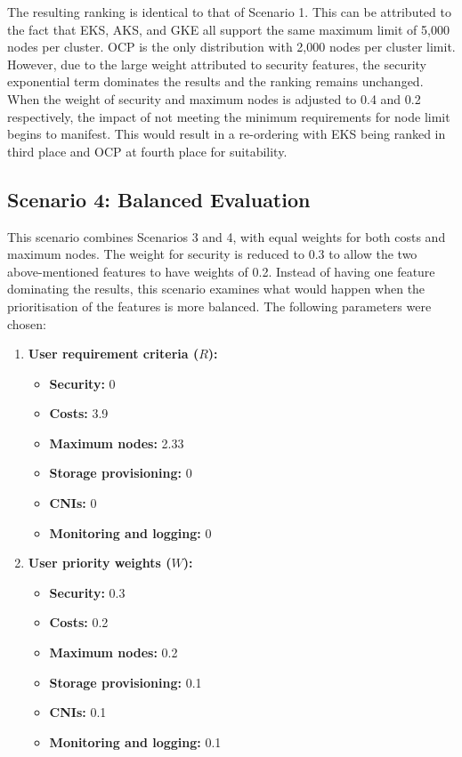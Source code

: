 The resulting ranking is identical to that of Scenario 1. This can be attributed to the fact that EKS, AKS, and GKE all support the same maximum limit of 5,000 nodes per cluster. OCP is the only distribution with 2,000 nodes per cluster limit. However, due to the large weight attributed to security features, the security exponential term dominates the results and the ranking remains unchanged. When the weight of security and maximum nodes is adjusted to 0.4 and 0.2 respectively, the impact of not meeting the minimum requirements for node limit begins to manifest. This would result in a re-ordering with EKS being ranked in third place and OCP at fourth place for suitability.

\subsection{Scenario 4: Balanced Evaluation}

This scenario combines Scenarios 3 and 4, with equal weights for both costs and maximum nodes. The weight for security is reduced to 0.3 to allow the two above-mentioned features to have weights of 0.2. Instead of having one feature dominating the results, this scenario examines what would happen when the prioritisation of the features is more balanced. The following parameters were chosen:

\begin{enumerate}
\def\labelenumi{\arabic{enumi}.}
\tightlist
\item
  \textbf{User requirement criteria (\(R\)):}
    \begin{itemize}
  \tightlist
  \item
    \textbf{Security:} 0
  \item
    \textbf{Costs:} 3.9
  \item
    \textbf{Maximum nodes:} 2.33
  \item
    \textbf{Storage provisioning:} 0
  \item
    \textbf{CNIs:} 0
  \item
    \textbf{Monitoring and logging:} 0
  \end{itemize}
\item
  \textbf{User priority weights (\(W\)):}

  \begin{itemize}
  \tightlist
  \item
    \textbf{Security:} 0.3
  \item
    \textbf{Costs:} 0.2
  \item
    \textbf{Maximum nodes:} 0.2
  \item
    \textbf{Storage provisioning:} 0.1
  \item
    \textbf{CNIs:} 0.1
  \item
    \textbf{Monitoring and logging:} 0.1
  \end{itemize}
\end{enumerate}

